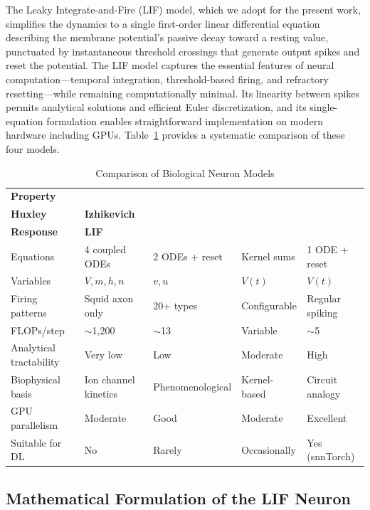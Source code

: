 The Leaky Integrate-and-Fire (LIF) model, which we adopt for the present work, simplifies the dynamics to a single first-order linear differential equation describing the membrane potential's passive decay toward a resting value, punctuated by instantaneous threshold crossings that generate output spikes and reset the potential. The LIF model captures the essential features of neural computation---temporal integration, threshold-based firing, and refractory resetting---while remaining computationally minimal. Its linearity between spikes permits analytical solutions and efficient Euler discretization, and its single-equation formulation enables straightforward implementation on modern hardware including GPUs. Table~\ref{tab:snn-neuron-comparison} provides a systematic comparison of these four models.

\begin{table}[H]
\centering
\caption{Comparison of Biological Neuron Models}
\label{tab:snn-neuron-comparison}
\small
\begingroup
\setlength{\tabcolsep}{3pt}
\renewcommand{\arraystretch}{1.12}
\begin{tabularx}{\textwidth}{>{\RaggedRight\arraybackslash}p{2.9cm}XXXX}
\toprule
\textbf{Property} & \makecell{\textbf{Hodgkin--}\\\textbf{Huxley}} & \textbf{Izhikevich} & \makecell{\textbf{Spike}\\\textbf{Response}} & \textbf{LIF} \\
\midrule
Equations & 4 coupled ODEs & 2 ODEs + reset & Kernel sums & 1 ODE + reset \\
Variables & $V, m, h, n$ & $v, u$ & $V(t)$ & $V(t)$ \\
Firing patterns & Squid axon only & 20+ types & Configurable & Regular spiking \\
FLOPs/step & $\sim$1{,}200 & $\sim$13 & Variable & $\sim$5 \\
Analytical tractability & Very low & Low & Moderate & High \\
Biophysical basis & Ion channel kinetics & Phenomenological & Kernel-based & Circuit analogy \\
GPU parallelism & Moderate & Good & Moderate & Excellent \\
Suitable for DL & No & Rarely & Occasionally & Yes (snnTorch) \\
\bottomrule
\end{tabularx}
\endgroup
\end{table}

\subsection{Mathematical Formulation of the LIF Neuron}

